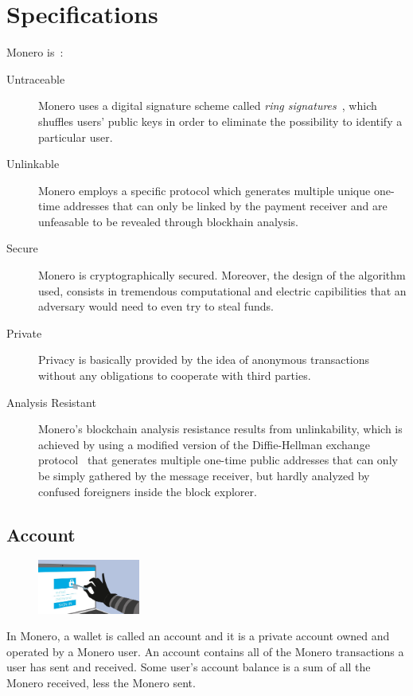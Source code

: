 \section{Specifications}
Monero is~\cite{monero}:
\begin{description}
  \item [Untraceable] Monero uses a digital signature scheme called \emph{ring signatures}~\cite{ringCT}, which shuffles users' public keys in order to eliminate the possibility to identify a particular user.
  \item [Unlinkable] Monero employs a specific protocol which generates multiple unique one-time addresses that can only be linked by the payment receiver and are unfeasable to be revealed through blockhain analysis.
  \item [Secure] Monero is cryptographically secured. Moreover, the design of the algorithm used, consists in tremendous computational and electric capibilities that an adversary would need to even try to steal funds.
  \item [Private] Privacy is basically provided by the idea of anonymous transactions without any obligations to cooperate with third parties.
  \item [Analysis Resistant] Monero's blockchain analysis resistance results from unlinkability, which is achieved by using a modified version of the Diffie-Hellman exchange protocol~\cite{Diffie:2006:NDC:2263321.2269104} that generates multiple one-time public addresses that can only be simply gathered by the message receiver, but hardly analyzed by confused foreigners inside the block explorer.
\end{description}
\pagebreak

\subsection{Account}
\begin{figure}
\centering
\includegraphics[width=0.3\textwidth]{Images/Monero/account.jpg}
\end{figure}
In Monero, a wallet is called an account and it is a private account owned and operated by a Monero user. An account contains all of the Monero transactions a user has sent and received. Some user's account balance is a sum of all the Monero received, less the Monero sent.

